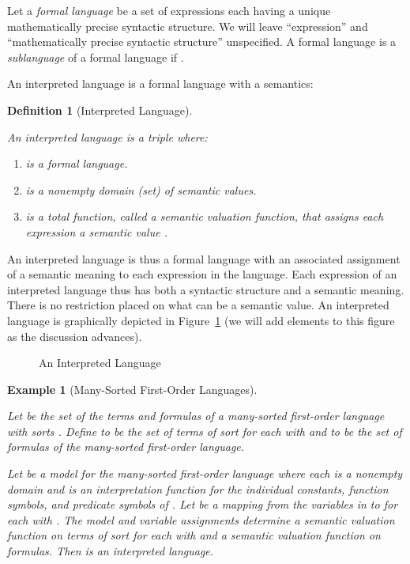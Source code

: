 \documentclass[11pt,fleqn]{article}
\newcommand{\be}{\begin{enumerate}}
\newcommand{\ee}{\end{enumerate}}
\newcommand{\bsp}{\begin{sloppypar}}
\newcommand{\esp}{\end{sloppypar}}
\newtheorem{eg}[thm]{Example}
\newtheorem{df}[thm]{Definition}
\begin{document}
Let a \emph{formal language} be a set of expressions each having a
unique mathematically precise syntactic structure.  We will leave
``expression'' and ``mathematically precise syntactic structure''
unspecified.  A formal language  is a \emph{sublanguage} of a
formal language  if .

An interpreted language is a formal language with a semantics:

\begin{df}[Interpreted Language] \label{df:interp-lang} \em \bsp
An \emph{interpreted language} is a triple  where: 

\be

  \item  is a formal language.

  \item  is a nonempty domain (set) of \emph{semantic
    values}.

  \item  is a total function,
    called a \emph{semantic valuation function}, that assigns each
    expression  a semantic value . \hfill 

\ee 
\esp
\end{df}
An interpreted language is thus a formal language with an associated
assignment of a semantic meaning to each expression in the language.
Each expression of an interpreted language thus has both a syntactic
structure and a semantic meaning.  There is no restriction placed on
what can be a semantic value.  An interpreted language is graphically
depicted in Figure~\ref{fig:interp-lang} (we will add elements to this
figure as the discussion advances).

\begin{figure}
\center
{}
\caption{An Interpreted Language}  \label{fig:interp-lang}
\end{figure}

\begin{eg}[Many-Sorted First-Order Languages] \label{eg:ms-fol} \em
\bsp Let  be the set of the terms and formulas of a many-sorted
first-order language with sorts .  Define
 to be the set of terms of sort  for each  with  and  to be the set of formulas of the
many-sorted first-order language. \esp

Let  be a model for the many-sorted first-order
language  where each  is a nonempty domain and  is an
interpretation function for the individual constants, function
symbols, and predicate symbols of .  Let  be a mapping from
the variables in  to  for each  with .
The model  and variable assignments
 determine a semantic valuation function  on terms of sort  for each  with  and a semantic valuation function  on formulas.  Then  is an interpreted language. \hfill 
\end{eg}
\end{document}
